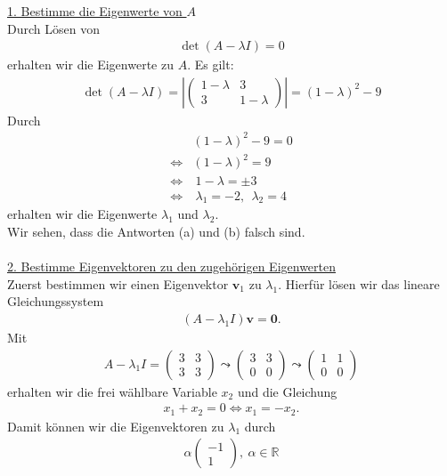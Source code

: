 \underline{1. Bestimme die Eigenwerte von $A$}\\
Durch Lösen von
\begin{align*}
\det(A - \lambda I ) = 0
\end{align*}
erhalten wir die Eigenwerte zu $A$.
Es gilt:
\begin{align*}
\det(A - \lambda I ) =
\left|
\begin{pmatrix}
1 - \lambda & 3 \\
3 & 1 - \lambda
\end{pmatrix}
\right|
=
(1- \lambda)^2 - 9
\end{align*}
Durch
\begin{align*}
&(1- \lambda)^2 - 9 = 0 \\
\Leftrightarrow
&(1- \lambda)^2 = 9 \\
\Leftrightarrow
&\ 1 - \lambda = \pm 3\\
\Leftrightarrow
&\ \lambda_1 = -2 , \ \ \lambda_2 = 4
\end{align*}
erhalten wir die Eigenwerte $\lambda_1$ und $\lambda_2$.\\
Wir sehen, dass die Antworten (a) und (b) falsch sind.\\
\\
\underline{2. Bestimme Eigenvektoren zu den zugehörigen Eigenwerten}\\
Zuerst bestimmen wir einen Eigenvektor $\textbf{v}_1$ zu $\lambda_1$.
Hierfür lösen wir das lineare Gleichungssystem
\begin{align*}
(A- \lambda_1 I ) \textbf{v} = \textbf{0}.
\end{align*}
Mit 
\begin{align*}
A- \lambda_1 I
=
\begin{pmatrix}
3 & 3 \\
3 & 3
\end{pmatrix} 
\leadsto
\begin{pmatrix}
3 & 3 \\
0 & 0
\end{pmatrix}
\leadsto
\begin{pmatrix}
1 & 1 \\
0 & 0
\end{pmatrix}
\end{align*}
erhalten wir die frei wählbare Variable $x_2$ und die 
Gleichung
\begin{align*}
x_1 + x_2 = 0
\Leftrightarrow
x_1 = -x_2.
\end{align*}
Damit können wir die Eigenvektoren zu $\lambda_1$ durch
\begin{align*}
\alpha 
\begin{pmatrix}
-1 \\
1
\end{pmatrix}
, \ \alpha \in \mathbb{R}
\end{align*}
